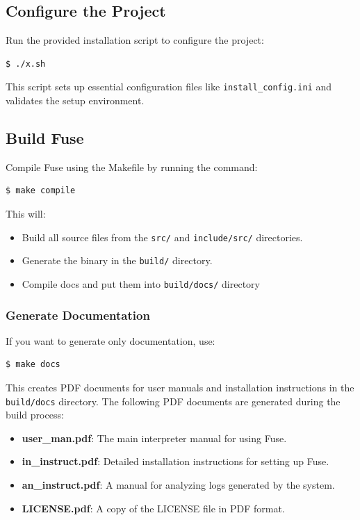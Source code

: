 \documentclass[a4paper,12pt]{article}
\begin{document}
\subsection{Configure the Project}
Run the provided installation script to configure the project:
\begin{lstlisting}[language=bash]
$ ./x.sh
\end{lstlisting}
This script sets up essential configuration files like \texttt{install\_config.ini} and validates the setup environment.

\subsection{Build Fuse}
Compile Fuse using the Makefile by running the command:
\begin{lstlisting}[language=bash]
$ make compile
\end{lstlisting}
This will:
\begin{itemize}
	\item Build all source files from the \texttt{src/} and \texttt{include/src/} directories.
	\item Generate the binary in the \texttt{build/} directory.
	\item Compile docs and put them into \texttt{build/docs/} directory
\end{itemize}

\subsubsection{Generate Documentation}
If you want to generate only documentation, use:
\begin{lstlisting}[language=bash]
$ make docs
\end{lstlisting}
This creates PDF documents for user manuals and installation instructions in the \texttt{build/docs} directory.
The following PDF documents are generated during the build process:
\begin{itemize}
	\item \textbf{user\_man.pdf}: The main interpreter manual for using Fuse.
	\item \textbf{in\_instruct.pdf}: Detailed installation instructions for setting up Fuse.
	\item \textbf{an\_instruct.pdf}: A manual for analyzing logs generated by the system.
	\item \textbf{LICENSE.pdf}: A copy of the LICENSE file in PDF format.
\end{itemize}
\end{document}
